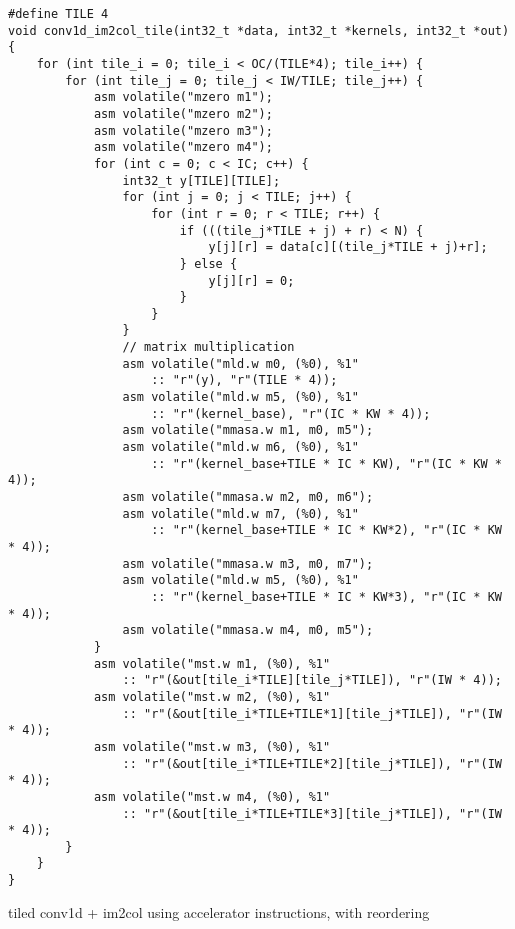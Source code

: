 \documentclass[acmsmall, nonacm=true]{acmart}
\begin{document}
\begin{listing}
    \centering
    \begin{verbatim}
#define TILE 4
void conv1d_im2col_tile(int32_t *data, int32_t *kernels, int32_t *out) {
    for (int tile_i = 0; tile_i < OC/(TILE*4); tile_i++) {
        for (int tile_j = 0; tile_j < IW/TILE; tile_j++) {
            asm volatile("mzero m1");
            asm volatile("mzero m2");
            asm volatile("mzero m3");
            asm volatile("mzero m4");
            for (int c = 0; c < IC; c++) {
                int32_t y[TILE][TILE];
                for (int j = 0; j < TILE; j++) {
                    for (int r = 0; r < TILE; r++) {
                        if (((tile_j*TILE + j) + r) < N) {
                            y[j][r] = data[c][(tile_j*TILE + j)+r];
                        } else {
                            y[j][r] = 0;
                        }                    
                    }
                }
                // matrix multiplication
                asm volatile("mld.w m0, (%0), %1"
                    :: "r"(y), "r"(TILE * 4));
                asm volatile("mld.w m5, (%0), %1"
                    :: "r"(kernel_base), "r"(IC * KW * 4));
                asm volatile("mmasa.w m1, m0, m5");
                asm volatile("mld.w m6, (%0), %1"
                    :: "r"(kernel_base+TILE * IC * KW), "r"(IC * KW * 4));
                asm volatile("mmasa.w m2, m0, m6");
                asm volatile("mld.w m7, (%0), %1"
                    :: "r"(kernel_base+TILE * IC * KW*2), "r"(IC * KW * 4));
                asm volatile("mmasa.w m3, m0, m7");
                asm volatile("mld.w m5, (%0), %1"
                    :: "r"(kernel_base+TILE * IC * KW*3), "r"(IC * KW * 4));
                asm volatile("mmasa.w m4, m0, m5");      
            }
            asm volatile("mst.w m1, (%0), %1"
                :: "r"(&out[tile_i*TILE][tile_j*TILE]), "r"(IW * 4));
            asm volatile("mst.w m2, (%0), %1"
                :: "r"(&out[tile_i*TILE+TILE*1][tile_j*TILE]), "r"(IW * 4));
            asm volatile("mst.w m3, (%0), %1"
                :: "r"(&out[tile_i*TILE+TILE*2][tile_j*TILE]), "r"(IW * 4));
            asm volatile("mst.w m4, (%0), %1"
                :: "r"(&out[tile_i*TILE+TILE*3][tile_j*TILE]), "r"(IW * 4));
        }
    }
}
\end{verbatim}
    \caption{tiled conv1d + im2col using accelerator instructions, with reordering}
    \label{lst:conv1d_im2col_tile_acc_unroll}
\end{listing}
\end{document}
